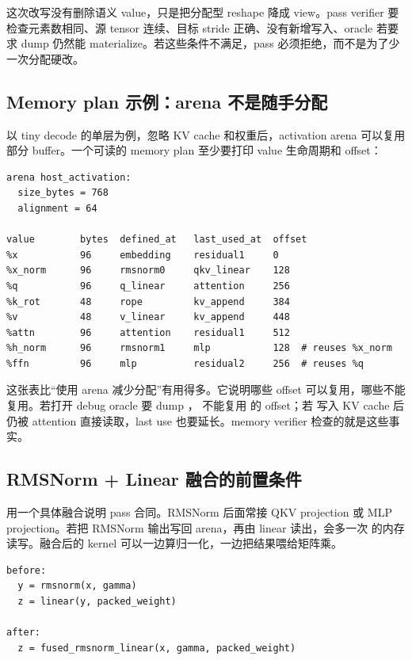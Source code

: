 这次改写没有删除语义 value，只是把分配型 reshape 降成 view。pass verifier 要检查元素数相同、源 tensor 连续、目标 stride 正确、没有新增写入、oracle 若要求 dump  仍然能 materialize。若这些条件不满足，pass 必须拒绝，而不是为了少一次分配硬改。

\subsection{Memory plan 示例：arena 不是随手分配}

以 tiny decode 的单层为例，忽略 KV cache 和权重后，activation arena 可以复用部分 buffer。一个可读的 memory plan 至少要打印 value 生命周期和 offset：

\begin{lstlisting}[numbers=none,caption={MiniLLM-CPU tiny memory plan 摘要}]
arena host_activation:
  size_bytes = 768
  alignment = 64

value        bytes  defined_at   last_used_at  offset
%x           96     embedding    residual1     0
%x_norm      96     rmsnorm0     qkv_linear    128
%q           96     q_linear     attention     256
%k_rot       48     rope         kv_append     384
%v           48     v_linear     kv_append     448
%attn        96     attention    residual1     512
%h_norm      96     rmsnorm1     mlp           128  # reuses %x_norm
%ffn         96     mlp          residual2     256  # reuses %q
\end{lstlisting}

这张表比“使用 arena 减少分配”有用得多。它说明哪些 offset 可以复用，哪些不能复用。若打开 debug oracle 要 dump ， 不能复用  的 offset；若  写入 KV cache 后仍被 attention 直接读取，last use 也要延长。memory verifier 检查的就是这些事实。

\subsection{RMSNorm + Linear 融合的前置条件}

用一个具体融合说明 pass 合同。RMSNorm 后面常接 QKV projection 或 MLP projection。若把 RMSNorm 输出写回 arena，再由 linear 读出，会多一次 \code{[N,H]} 的内存读写。融合后的 kernel 可以一边算归一化，一边把结果喂给矩阵乘。

\begin{lstlisting}[numbers=none,caption={融合前后的图形态}]
before:
  y = rmsnorm(x, gamma)
  z = linear(y, packed_weight)

after:
  z = fused_rmsnorm_linear(x, gamma, packed_weight)
\end{lstlisting}

